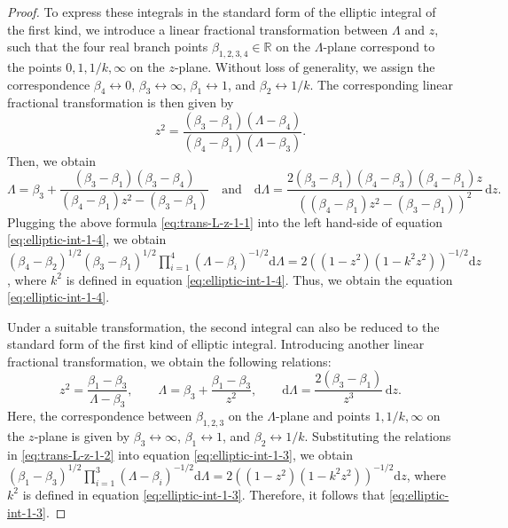 \documentclass[11pt,reqno]{amsart}
\newcommand{\dd}{\mathrm{d}}
\numberwithin{equation}{section}
\begin{document}
\begin{proof}
	To express these integrals in the standard form of the elliptic integral of the first kind, we introduce a linear fractional transformation between $\Lambda$ and $z$, such that the four real branch points $\beta_{1,2,3,4}\in \mathbb{R}$ on the $\Lambda$-plane correspond to the points $0, 1, 1/k, \infty$ on the $z$-plane.
	Without loss of generality, we assign the correspondence $\beta_4\leftrightarrow 0$, $\beta_3\leftrightarrow \infty$, $\beta_1\leftrightarrow 1$, and $\beta_2\leftrightarrow 1/k$. 
	The corresponding linear fractional transformation is then given by
	\begin{equation}\label{eq:trans-z-Lambda-1}
		z^2=\frac{(\beta_3 - \beta_1)(\Lambda - \beta_4)}{(\beta_4 - \beta_1)(\Lambda - \beta_3)}.
	\end{equation}
	Then, we obtain 
	\begin{equation}\label{eq:trans-L-z-1-1}
		\Lambda=\beta_3+\frac{(\beta_3-\beta_1)(\beta_3-\beta_4)}{(\beta_4-\beta_1)z^2-(\beta_3-\beta_1)} \quad \text{and} \quad 
		\dd \Lambda=\frac{2(\beta_3-\beta_1)(\beta_4-\beta_3)(\beta_4-\beta_1)z}{((\beta_4-\beta_1)z^2-(\beta_3-\beta_1))^2}\, \dd z.
	\end{equation} 
	Plugging the above formula \eqref{eq:trans-L-z-1-1} into the left hand-side of equation \eqref{eq:elliptic-int-1-4}, we obtain $(\beta_4-\beta_2)^{1/2}(\beta_3-\beta_1)^{1/2}\prod_{i=1}^{4}(\Lambda-\beta_i)^{-1/2} \dd \Lambda=2  ((1-z^2)(1-k^2z^2))^{-1/2} \dd z$,
	where $k^2$ is defined in equation \eqref{eq:elliptic-int-1-4}. 
	Thus, we obtain the equation \eqref{eq:elliptic-int-1-4}.
	
	Under a suitable transformation, the second integral can also be reduced to the standard form of the first kind of elliptic integral.
	Introducing another linear fractional transformation, we obtain the following relations:
	\begin{equation}\label{eq:trans-L-z-1-2}
		z^{2}=\frac{\beta_1-\beta_3}{\Lambda-\beta_3}, \qquad \Lambda = \beta_3 +\frac{\beta_1-\beta_3}{z^2}, \qquad 
		\dd \Lambda = \frac{2(\beta_3-\beta_1)}{z^3} \, \dd z.
	\end{equation}
	Here, the correspondence between $\beta_{1,2,3}$ on the $\Lambda$-plane and points $1, 1/k, \infty$ on the $z$-plane is given by $\beta_3\leftrightarrow \infty$, $\beta_1\leftrightarrow 1$, and $\beta_2\leftrightarrow 1/k$.
	Substituting the relations in \eqref{eq:trans-L-z-1-2} into equation \eqref{eq:elliptic-int-1-3}, we obtain $(\beta_1-\beta_3)^{1/2} \prod_{i=1}^{3}(\Lambda-\beta_i)^{-1/2} \dd \Lambda=2((1-z^2)(1-k^2z^2))^{-1/2} \dd z$,
	where $k^2$ is defined in equation \eqref{eq:elliptic-int-1-3}.
	Therefore, it follows that \eqref{eq:elliptic-int-1-3}.
\end{proof}
\end{document}
